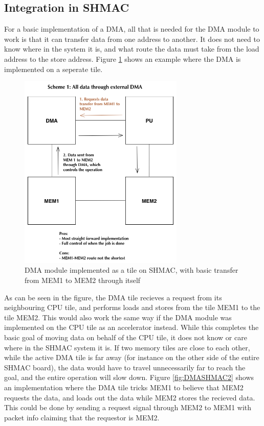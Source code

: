 \subsection{Integration in SHMAC}
For a basic implementation of a DMA, all that is needed for the DMA module to work is that it can transfer data from one address to another.
It does not need to know where in the system it is, and what route the data must take from the load address to the store address.
Figure \ref{fig:DMASHMAC1} shows an example where the DMA is implemented on a seperate tile.

\begin{figure}[h!]
    \centering
    \includegraphics[width=0.7\textwidth]{Figures/DMA/DMASHMAC1}
    \caption{DMA module implemented as a tile on SHMAC, with basic transfer from MEM1 to MEM2 through itself}
    \label{fig:DMASHMAC1}
\end{figure}
 
As can be seen in the figure, the DMA tile recieves a request from its neighbouring CPU tile, and performs loads and stores from the tile MEM1 to the tile MEM2.
This would also work the same way if the DMA module was implemented on the CPU tile as an accelerator instead.
While this completes the basic goal of moving data on behalf of the CPU tile, it does not know or care where in the SHMAC system it is.
If two memory tiles are close to each other, while the active DMA tile is far away (for instance on the other side of the entire SHMAC board), the data would have to travel unnecessarily far to reach the goal, and the entire operation will slow down.
Figure \ref{fig:DMASHMAC2} shows an implementation where the DMA tile tricks MEM1 to believe that MEM2 requests the data, and loads out the data while MEM2 stores the recieved data.
This could be done by sending a request signal through MEM2 to MEM1 with packet info claiming that the requestor is MEM2. 

